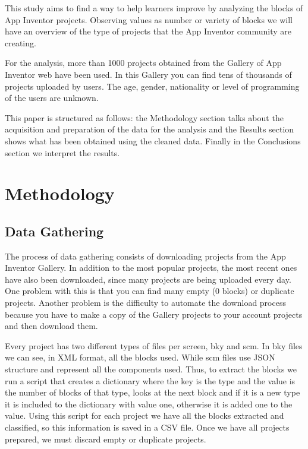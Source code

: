 \documentclass[a4paper]{article}
\begin{document}
This study aims to find a way to help learners improve by analyzing the blocks of App Inventor projects. Observing values as number or variety of blocks we will have an overview of the type of projects that the App Inventor community are creating.

For the analysis, more than 1000 projects obtained from the Gallery of App Inventor web have been used. 
In this Gallery you can find tens of thousands of projects uploaded by users. The age, gender, nationality or level of programming of the users are unknown.

This paper is structured as follows: the Methodology section talks about the acquisition and preparation of the data for the analysis and the Results section shows what has been obtained using the cleaned data. Finally in the Conclusions section we interpret the results.

\section{Methodology}


\subsection{Data Gathering}

The process of data gathering consists of downloading projects from the App Inventor Gallery. In addition to the most popular projects, the most recent ones have also been downloaded, since many projects are being uploaded every day. One problem with this is that you can find many empty (0 blocks) or duplicate projects. Another problem is the difficulty to automate the download process because you have to make a copy of the Gallery projects to your account projects and then download them.


Every project has two different types of files per screen, bky and scm. In bky files we can see, in XML format, all the blocks used. While scm files use JSON structure and represent all the components used. Thus, to extract the blocks we run a script that creates a dictionary where the key is the type and the value is the number of blocks of that type, looks at the next block and if it is a new type it is included to the dictionary with value one, otherwise it is added one to the value. Using this script for each project we have all the blocks extracted and classified, so this information is saved in a CSV file. Once we have all projects prepared, we must discard empty or duplicate projects.
\end{document}
